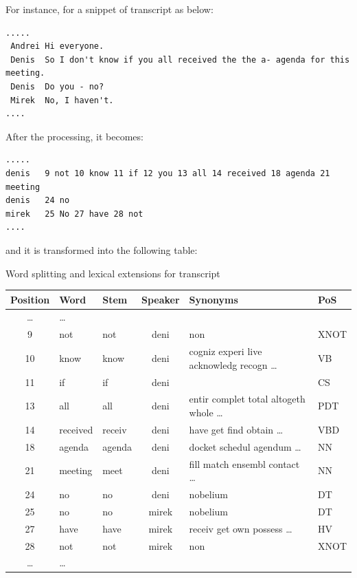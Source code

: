\documentclass[10pt,a4paper]{article}
\numberwithin{algorithm}{section}  %
\begin{document}
\normalsize



For instance, for a snippet of transcript as below:
\scriptsize
\begin{verbatim}
.....
 Andrei Hi everyone. 
 Denis  So I don't know if you all received the the a- agenda for this meeting.
 Denis 	Do you - no?
 Mirek 	No, I haven't.
....
\end{verbatim}
\normalsize

After the processing, it becomes:
\scriptsize
\begin{verbatim}
.....
denis   9 not 10 know 11 if 12 you 13 all 14 received 18 agenda 21 meeting
denis   24 no 
mirek   25 No 27 have 28 not
....
\end{verbatim}
\normalsize

and it is transformed into the following table:

\begin{center}
\begin{threeparttable}
\scriptsize
\caption{Word splitting and lexical extensions for transcript}
\label{word_splitting_transcript}
\begin{tabular}{|c|l|l|c|l|l|}
\hline  \bf{Position} & \bf{Word} & \bf{Stem} & \bf{Speaker} & \bf{Synonyms} &\bf{PoS} \\
\hline \ldots & \ldots & & & &\\
\hline 9 & not & not & deni & non & XNOT\\
\hline 10 & know & know & deni & cogniz experi live acknowledg recogn \ldots & VB\\
\hline 11 & if & if & deni & & CS\\
\hline 13 & all & all & deni & entir complet total altogeth whole  \ldots & PDT\\
\hline 14 & received & receiv & deni & have get find obtain \ldots &VBD\\
\hline 18 & agenda & agenda & deni & docket schedul agendum \ldots & NN\\
\hline 21 & meeting & meet & deni & fill match ensembl contact \ldots & NN\\
\hline 24 & no & no & deni & nobelium & DT\\
\hline 25 & no & no & mirek & nobelium & DT\\
\hline 27 & have &have &mirek &  receiv get own possess \ldots &HV\\
\hline 28 & not &not &mirek & non&XNOT\\
\hline \ldots & \ldots & & & &\\
\hline 
\end{tabular}
\end{threeparttable}
\end{center}
\end{document}
